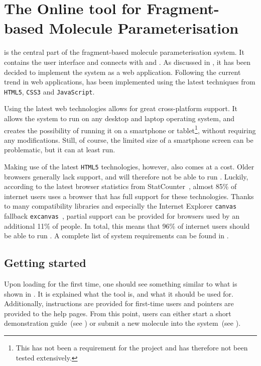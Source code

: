 \section[\oframp]{The Online tool for Fragment-based Molecule Parameterisation}
\oframp{} is the central part of the fragment-based molecule parameterisation system. It contains the user interface and connects with \oapoc{} and \omfraf{}. As discussed in , it has been decided to implement the system as a web application. Following the current trend in web applications, \oframp{} has been implemented using the latest techniques from \verb|HTML5|, \verb|CSS3| and \verb|JavaScript|.

Using the latest web technologies allows for great cross-platform support. It allows the system to run on any desktop and laptop operating system, and creates the possibility of running it on a smartphone or tablet\footnote{This has not been a requirement for the project and has therefore not been tested extensively.}, without requiring any modifications. Still, of course, the limited size of a smartphone screen can be problematic, but it can at least run.

Making use of the latest \verb|HTML5| technologies, however, also comes at a cost. Older browsers generally lack support, and will therefore not be able to run \oframp. Luckily, according to the latest browser statistics from StatCounter~\cite{statcounter2014statcounter}, almost 85\% of internet users uses a browser that has full support for these technologies. Thanks to many compatibility libraries and especially the Internet Explorer \verb|canvas| fallback \verb|excanvas|~\cite{arvidsson2009explorercanvas}, partial support can be provided for browsers used by an additional 11\% of people. In total, this means that 96\% of internet users should be able to run \oframp. A complete list of system requirements can be found in .

\subsection{Getting started}

Upon loading \oframp{} for the first time, one should see something similar to what is shown in . It is explained what the tool is, and what it should be used for. Additionally, instructions are provided for first-time users and pointers are provided to the help pages. From this point, users can either start a short demonstration guide~(see ) or submit a new molecule into the system~(see ).

